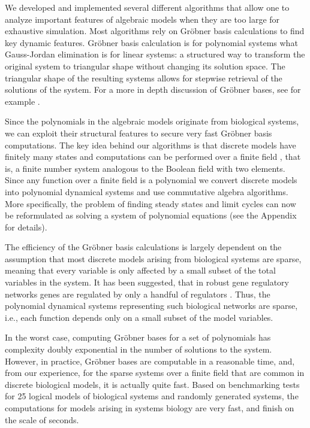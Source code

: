 \documentclass[11pt]{amsart}
\begin{document}
We developed and implemented several different algorithms that allow one to analyze
important features of algebraic models when they are too large for exhaustive simulation.
Most algorithms rely on Gr\"obner basis calculations to find key dynamic
features. Gr\"obner basis calculation is for polynomial systems what
Gauss-Jordan elimination is for linear systems: a structured way to transform
the original system to triangular shape without changing its solution space.
The triangular shape of the resulting systems allows for stepwise retrieval of the solutions of the system. For a more in depth discussion of Gr\"obner bases, see for example \cite{IVA}.

%
%
%

Since the polynomials in the algebraic
models originate from biological systems, we can exploit their structural
features to secure very fast Gr\"obner basis computations.
The key idea behind our algorithms is that discrete models have finitely many states and computations
can be performed over a finite field \cite{Alan:Bioinf2010,
Hinkelmann:2010}, that is, a finite number system analogous to the Boolean field with two elements.
Since any function over a finite field is a polynomial
\cite{Lidl:1997} we convert discrete models into polynomial dynamical systems
and use commutative algebra algorithms. More specifically, the problem of finding steady states and limit cycles
can now be reformulated as solving a system of polynomial equations (see the Appendix for details).

The efficiency of the Gr\"obner basis calculations is largely dependent on the
assumption that most discrete models arising from biological systems are
sparse, meaning that every variable is only affected by a small subset of the
total variables in the system. It has been suggested, that in robust gene
regulatory networks genes are regulated by only a handful of regulators
\cite{Leclerc:2008}. Thus, the polynomial dynamical systems representing such biological networks are
sparse, i.e., each function depends only on a small subset of the model variables.

In the worst case, computing Gr\"obner bases for a set of polynomials has
complexity doubly exponential in the number of solutions to the system.
However, in practice, Gr\"{o}bner bases are computable in a reasonable time, and, from our experience,
for the sparse systems over a finite field that are common in discrete
biological models, it is actually quite fast.
Based on benchmarking tests for
25 logical models of biological systems \cite{GINsimRepo}
and randomly generated systems,
the computations for models arising in systems biology are very fast, and finish on the scale of
seconds.
\end{document}
